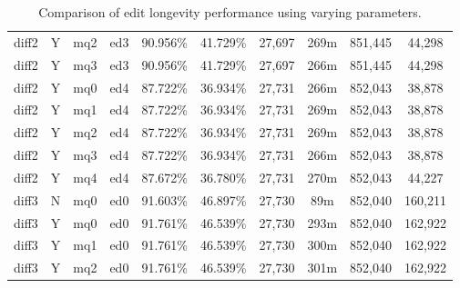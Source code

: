 \begin{sidewaystable}[!tp]
\begin{center}
\begin{tabular}{|c|c|c|c||c|c||c|c|c|c|}
diff2 & Y & mq2 & ed3 & 90.956\% & 41.729\% & 27,697 & 269m & 851,445 & 44,298 \\
diff2 & Y & mq3 & ed3 & 90.956\% & 41.729\% & 27,697 & 266m & 851,445 & 44,298 \\
diff2 & Y & mq0 & ed4 & 87.722\% & 36.934\% & 27,731 & 266m & 852,043 & 38,878 \\
diff2 & Y & mq1 & ed4 & 87.722\% & 36.934\% & 27,731 & 269m & 852,043 & 38,878 \\
diff2 & Y & mq2 & ed4 & 87.722\% & 36.934\% & 27,731 & 269m & 852,043 & 38,878 \\
diff2 & Y & mq3 & ed4 & 87.722\% & 36.934\% & 27,731 & 266m & 852,043 & 38,878 \\
diff2 & Y & mq4 & ed4 & 87.672\% & 36.780\% & 27,731 & 270m & 852,043 & 44,227 \\
diff3 & N & mq0 & ed0 & 91.603\% & 46.897\% & 27,730 & 89m & 852,040 & 160,211 \\
diff3 & Y & mq0 & ed0 & 91.761\% & 46.539\% & 27,730 & 293m & 852,040 & 162,922 \\
diff3 & Y & mq1 & ed0 & 91.761\% & 46.539\% & 27,730 & 300m & 852,040 & 162,922 \\
diff3 & Y & mq2 & ed0 & 91.761\% & 46.539\% & 27,730 & 301m & 852,040 & 162,922 \\
\hline
\end{tabular}
\end{center}
\caption{Comparison of edit longevity performance using
    varying parameters.}
\end{sidewaystable}

